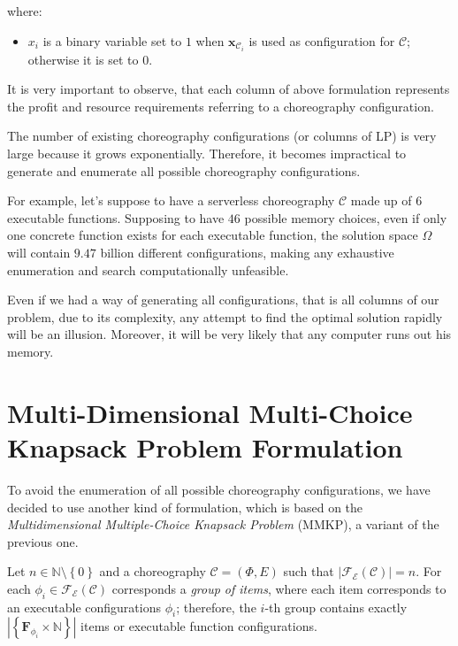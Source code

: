 \documentclass[12pt,a4paper]{report}
\newcommand{\N}{\mathbb{N}}
\begin{document}
where:

\begin{itemize}
	\item $x_i$ is a binary variable set to $1$ when  $\textbf{x}_{\mathcal{C}_i}$ is used as configuration for $\mathcal{C}$; otherwise it is set to $0$.
\end{itemize}

It is very important to observe, that each column of above formulation represents the profit and resource requirements referring to a choreography configuration.

The number of existing choreography configurations (or columns of LP) is very large because it grows exponentially. Therefore, it becomes impractical to generate and enumerate all possible choreography configurations.

For example, let's suppose to have a serverless choreography $\mathcal{C}$ made up of $6$ executable functions. Supposing to have $46$ possible memory choices, even if only one concrete function exists for each executable function, the solution space $\Omega$ will contain $9.47$ billion different configurations, making any exhaustive enumeration and search computationally unfeasible. 

Even if we had a way of generating all configurations, that is all columns of our problem, due to its complexity, any attempt to find the optimal solution rapidly will be an illusion. Moreover, it will be very likely that any computer runs out his memory.

\section{Multi-Dimensional Multi-Choice Knapsack Problem Formulation}\label{MMKKSection}

To avoid the enumeration of all possible choreography configurations, we have decided to use another kind of formulation, which is based on the \textit{Multidimensional Multiple-Choice Knapsack Problem} (MMKP), a variant of the previous one. 

Let $n \in \N \setminus \left\{0\right\}$ and a choreography $\mathcal{C} = (\Phi,E)$ such that $|\mathscr{F_E}(\mathcal{C})| = n$. For each $\phi_i \in \mathscr{F_E}(\mathcal{C})$ corresponds a \textit{group of items}, where each item corresponds to an executable configurations $\phi_i$; therefore, the $i$-th group contains exactly $|\left\{ \textbf{F}_{\phi_{i}} \times \N \right\}|$ items or executable function configurations.
\end{document}
